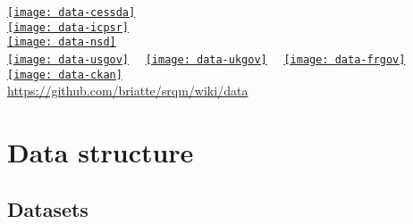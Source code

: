 \documentclass[t]{beamer}
\begin{document}
	\begin{frame}[c, plain]

		\begin{center}
			\href{http://www.cessda.org/}%
  			{\texttt{[image: data-cessda]}}\\[.5em]
			\href{http://www.icpsr.umich.edu/}%
  			{\texttt{[image: data-icpsr]}}\\[.5em]
			\href{http://www.nsd.uib.no/macrodataguide/}%
  			{\texttt{[image: data-nsd]}}\\[.5em]
			\href{http://www.data.gov/}%
  			{\texttt{[image: data-usgov]}}~~%
			\href{http://www.data.gov.uk/}%
  			{\texttt{[image: data-ukgov]}}~~%
			\href{http://www.data.gouv.fr/}%
  			{\texttt{[image: data-frgov]}}\\[.5em]
			\href{http://ckan.org//}%
  			{\texttt{[image: data-ckan]}}\\[1em]
				
			\small{\url{https://github.com/briatte/srqm/wiki/data}}
		\end{center}
		
	\end{frame}
	
	\section{Data structure}

  \subsection{Datasets}
  
\end{document}
